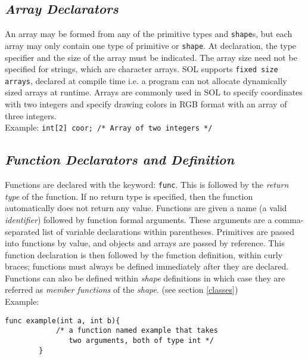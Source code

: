     \subsection{\textit{Array Declarators}} \label{array}
    An array may be formed from any of the primitive types and \texttt{shape}s, but each array may only contain one type of primitive or \texttt{shape}. At declaration, the type specifier and the size of the array must be indicated. The array size need not be specified for strings, which are character arrays. SOL supports \texttt{fixed size arrays}, declared at compile time i.e. a program can not allocate dynamically sized arrays at runtime. Arrays are commonly used in SOL to specify coordinates with two integers and specify drawing colors in RGB format with an array of three integers.\\
    Example: \texttt{int[2] coor; /* Array of two integers */}

    \subsection{\textit{Function Declarators and Definition}} \label{function}
    Functions are declared with the keyword: \texttt{func}. This is followed by the \textit{return type} of the function. If no return type is specified, then the function automatically does not return any value. Functions are given a name (a valid \textit{identifier}) followed by function formal arguments. These arguments are a comma-separated list of variable declarations within parentheses. Primitives are passed into functions by value, and objects and arrays are passed by reference. This function declaration is then followed by the function definition, within curly braces; functions must always be defined immediately after they are declared.\\
    Functions can also be defined within \textit{shape} definitions in which case they are referred as \textit{member functions} of the \textit{shape}. (see section \ref{classes})\\

    Example:\\
    \begin{lstlisting}[style=sol]
        func example(int a, int b){
            /* a function named example that takes
               two arguments, both of type int */
        }
    \end{lstlisting}

